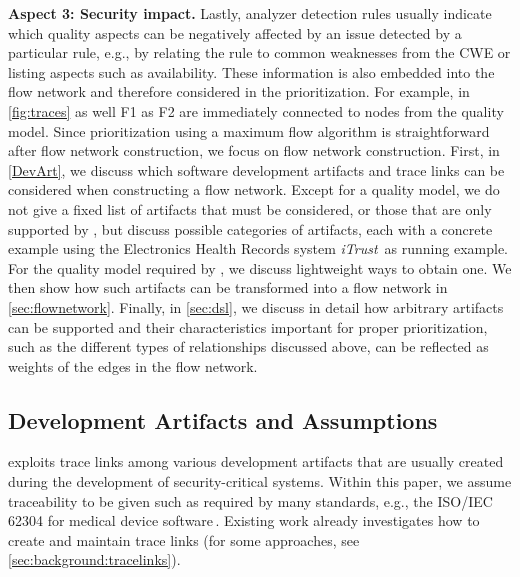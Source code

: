 	\textbf{Aspect 3: Security impact.} Lastly, analyzer detection rules usually indicate which quality aspects can be negatively affected by an issue detected by a particular rule, e.g., by relating the rule to common weaknesses from the CWE or listing aspects such as availability.
	These information is also embedded into the flow network and therefore considered in the prioritization.
	For example, in \autoref{fig:traces} as well F1 as F2 are immediately connected to nodes from the quality model.
%
%
Since prioritization using a maximum flow algorithm is straightforward after flow network construction, we focus on flow network construction.
First, in \autoref{DevArt}, we discuss which software development artifacts and trace links can be considered when constructing a flow network.
Except for a quality model, we do not give a fixed list of artifacts that must be considered, or those that are only supported by \appr{}, but discuss possible categories of artifacts, each with a concrete example using the Electronics Health Records system \emph{iTrust}\,\cite{iTrust} as running example.
For the quality model required by \appr{}, we discuss lightweight ways to obtain one.
We then show how such artifacts can be transformed into a flow network in \autoref{sec:flownetwork}.
Finally, in \autoref{sec:dsl}, we discuss in detail how arbitrary artifacts can be supported and their characteristics important for proper prioritization, such as the different types of relationships discussed above, can be reflected as weights of the edges in the flow network.

\subsection{Development Artifacts and Assumptions}
\label{DevArt}
%
\appr{} exploits trace links among various development artifacts that are usually created during the development of security-critical systems.
Within this paper, we assume traceability to be given such as required by many standards, e.g., the ISO/IEC 62304 for medical device software\,\cite{IEC62304}.
Existing work already investigates how to create and maintain trace links (for some approaches, see \autoref{sec:background:tracelinks}).

